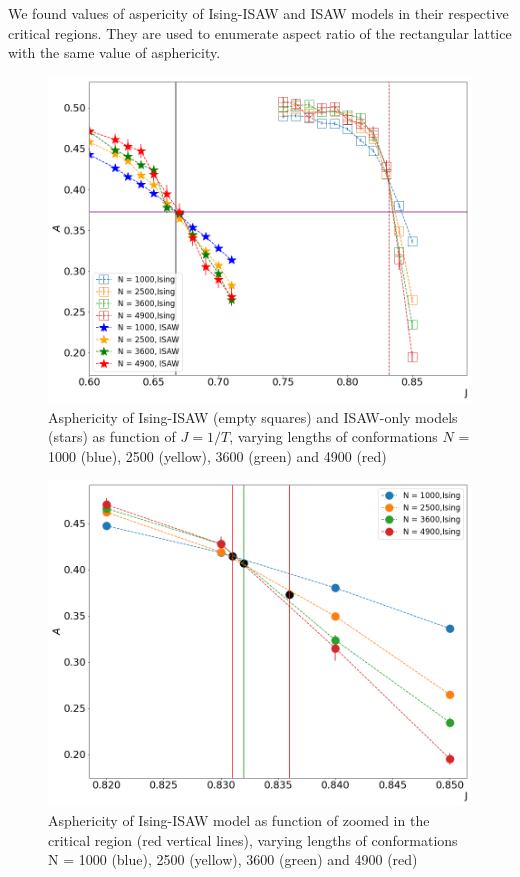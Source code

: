 \documentclass[aps,pre,amssymb,amsmath,twocolumn,floatfix]{revtex4-2}
\begin{document}
 We found values of aspericity of Ising-ISAW and ISAW models in their respective critical regions. They are used to enumerate aspect ratio of the rectangular lattice with the same value of asphericity.

\begin{figure}[h]
    \centering
    \includegraphics[width=\columnwidth]{Images/Ising_ISAW_A_J_Full.png}
    \caption{Asphericity of Ising-ISAW (empty squares) and ISAW-only models (stars) as function of $J=1/T$, varying lengths of conformations $N$ = 1000 (blue), 2500 (yellow), 3600 (green) and 4900 (red)}
    \label{fig:Ising&ISAW_A_J}
\end{figure}

\begin{figure}[h]
    \centering
    \includegraphics[width=\columnwidth]{Images/Ising_A_J_Close.png}
    \caption{Asphericity of Ising-ISAW model as function of zoomed in the critical region (red vertical lines), varying lengths of conformations N = 1000 (blue), 2500 (yellow), 3600 (green) and 4900 (red)}
    \label{fig:Ising_A_J}
\end{figure}
\end{document}
